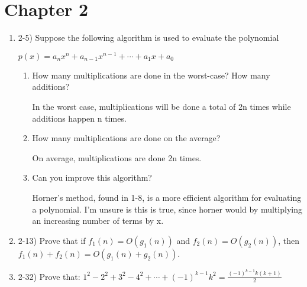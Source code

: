 \documentclass{article}
\begin{document}
\section{Chapter 2}
\begin{enumerate}
    \item 2-5) Suppose the following algorithm is used to evaluate the polynomial
    
    \(p(x)=a_nx^n+a_{n-1}x^{n-1}+\cdots+a_1x+a_0\)
    
    \begin{center}
    \end{center}
    \begin{enumerate}
        \item How many multiplications are done in the worst-case? How many additions?

        In the worst case, multiplications will be done a total of 2n times while additions happen n times.

        \item How many multiplications are done on the average?

        On average, multiplications are done 2n times.
        
        \item Can you improve this algorithm?

        Horner's method, found in 1-8, is a more efficient algorithm for evaluating a polynomial.
        I'm unsure is this is true, since horner would by multiplying an increasing number of terms by x.
        
    \end{enumerate}
    \item 2-13) Prove that if $f_1(n) =O(g_1(n))$ and $f_2(n)=O(g_2(n))$, then $f_1(n)+f_2(n)=O(g_1(n)+g_2(n))$.

    

    \item 2-32) Prove that: 
    \(1^2-2^2+3^2-4^2+\cdots+(-1)^{k-1}k^2=\frac{(-1)^{k-1}k(k+1)}{2}\)


\end{enumerate}
\end{document}
